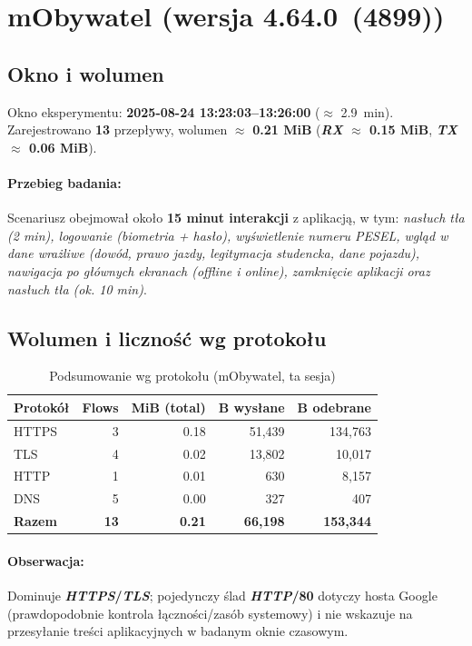 \section{mObywatel (wersja 4.64.0 \,(4899))}
\label{sec:mobywatel}

\subsection*{Okno i wolumen}
Okno eksperymentu: \textbf{2025-08-24 13{:}23{:}03–13{:}26{:}00} ($\approx$ \SI{2.9}{\minute}). 
Zarejestrowano \textbf{13} przepływy, wolumen $\approx$ \textbf{0.21 MiB} 
(\textbf{\emph{RX} $\approx$ 0.15 MiB}, \textbf{\emph{TX} $\approx$ 0.06 MiB}).

\paragraph{Przebieg badania:} 
Scenariusz obejmował około \textbf{15 minut interakcji} z aplikacją, w tym: 
\emph{nasłuch tła (2 min), logowanie (biometria + hasło), wyświetlenie numeru PESEL, wgląd w dane wrażliwe (dowód, prawo jazdy, legitymacja studencka, dane pojazdu), nawigacja po głównych ekranach (offline i online), zamknięcie aplikacji oraz nasłuch tła (ok. 10 min)}.

\subsection{Wolumen i liczność wg protokołu}
\begin{table}[H]
  \centering
  \caption{Podsumowanie wg protokołu (mObywatel, ta sesja)}
  \label{tab:mobywatel-proto}
  \begin{tabular}{lrrrr}
    \toprule
    \textbf{Protokół} & \textbf{Flows} & \textbf{MiB (total)} & \textbf{B wysłane} & \textbf{B odebrane} \\
    \midrule
    HTTPS & 3  & 0.18 & 51{,}439 & 134{,}763 \\
    TLS   & 4  & 0.02 & 13{,}802 & 10{,}017 \\
    HTTP  & 1  & 0.01 & 630      & 8{,}157 \\
    DNS   & 5  & 0.00 & 327      & 407 \\
    \midrule
    \textbf{Razem} & \textbf{13} & \textbf{0.21} & \textbf{66{,}198} & \textbf{153{,}344} \\
    \bottomrule
  \end{tabular}
\end{table}

\paragraph{Obserwacja:} 
Dominuje \textbf{\emph{HTTPS}/\emph{TLS}}; pojedynczy ślad \textbf{\emph{HTTP}/80} dotyczy hosta Google (prawdopodobnie kontrola łączności/zasób systemowy) i nie wskazuje na przesyłanie treści aplikacyjnych w badanym oknie czasowym.

